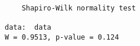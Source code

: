 \begin{verbatim} 

	Shapiro-Wilk normality test

data:  data
W = 0.9513, p-value = 0.124

\end{verbatim}